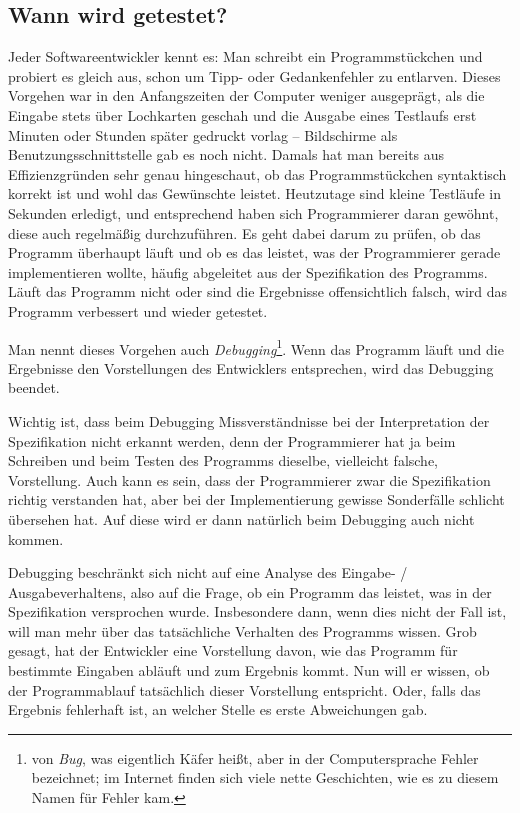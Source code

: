 \subsection{Wann wird getestet?}
\label{sec:Kap-11-1-1}

Jeder Softwareentwickler 
kennt es: Man schreibt ein Programmstückchen und probiert es gleich aus, schon um Tipp- oder Gedankenfehler zu entlarven. Dieses Vorgehen war in den Anfangszeiten der Computer weniger ausgeprägt, als die Eingabe stets über Lochkarten geschah und die Ausgabe eines Testlaufs erst Minuten oder Stunden später gedruckt vorlag – Bildschirme als Benutzungsschnittstelle gab es noch nicht. Damals hat man bereits aus Effizienzgründen sehr genau hingeschaut, ob das Programmstückchen syntaktisch korrekt ist und wohl das Gewünschte leistet. Heutzutage sind kleine Testläufe in Sekunden erledigt, und entsprechend haben sich Programmierer daran gewöhnt, diese auch regelmäßig durchzuführen. Es geht dabei darum zu prüfen, ob das Programm überhaupt läuft und ob es das leistet, was der Programmierer gerade implementieren wollte, häufig abgeleitet aus der Spezifikation des Programms. Läuft das Programm nicht oder sind die Ergebnisse offensichtlich falsch, wird das Programm verbessert und wieder getestet.

Man nennt dieses Vorgehen auch \emph{Debugging}\footnote{von \emph{Bug}, was eigentlich Käfer heißt, aber in der Computersprache Fehler bezeichnet; im Internet finden sich viele nette Geschichten, wie es zu diesem Namen für Fehler kam.}. Wenn das Programm läuft und die Ergebnisse den Vorstellungen des Entwicklers entsprechen, wird das Debugging beendet.

Wichtig ist, dass beim Debugging Missverständnisse bei der Interpretation der Spezifikation nicht erkannt werden, denn der Programmierer hat ja beim Schreiben und beim Testen des Programms dieselbe, vielleicht falsche, Vorstellung. Auch kann es sein, dass der Programmierer zwar die Spezifikation richtig verstanden hat, aber bei der Implementierung gewisse Sonderfälle schlicht übersehen hat. Auf diese wird er dann natürlich beim Debugging auch nicht kommen.

Debugging beschränkt sich nicht auf eine Analyse des Eingabe- / Ausgabeverhaltens, also auf die Frage, ob ein Programm das leistet, was in der Spezifikation versprochen wurde. Insbesondere dann, wenn dies nicht der Fall ist, will man mehr über das tatsächliche Verhalten des Programms wissen. Grob gesagt, hat der Entwickler eine Vorstellung davon, wie das Programm für bestimmte Eingaben abläuft und zum Ergebnis kommt. Nun will er wissen, ob der Programmablauf tatsächlich dieser Vorstellung entspricht. Oder, falls das Ergebnis fehlerhaft ist, an welcher Stelle es erste Abweichungen gab.


